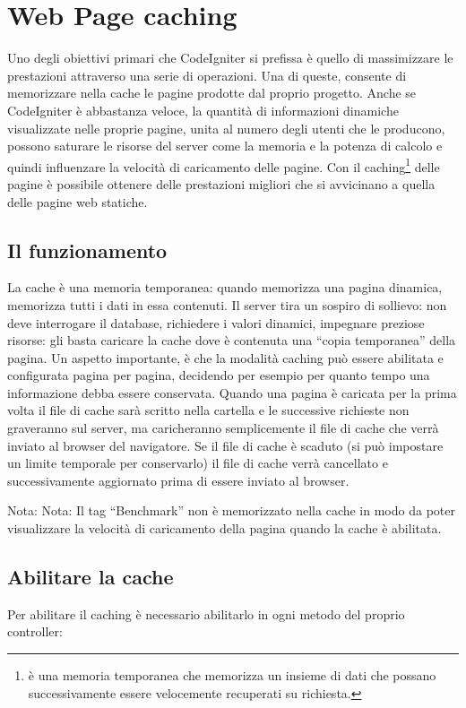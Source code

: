 \chapter{Web Page caching}
\label{cap:cache}

Uno degli obiettivi primari che CodeIgniter si prefissa è quello di massimizzare le prestazioni attraverso una serie di operazioni. Una di queste, consente di memorizzare nella cache le pagine prodotte dal proprio progetto. Anche se CodeIgniter è abbastanza veloce, la quantità di informazioni dinamiche visualizzate nelle proprie pagine, unita al numero degli utenti che le producono, possono saturare le risorse del server come la memoria e la potenza di calcolo e quindi influenzare la velocità di caricamento delle pagine. Con il caching\footnote{è una memoria temporanea che memorizza un insieme di dati che possano successivamente essere velocemente recuperati su richiesta.} delle pagine è possibile ottenere delle prestazioni migliori che si avvicinano a quella delle pagine web statiche.

\section{Il funzionamento}
La cache è una memoria temporanea: quando memorizza una pagina dinamica, memorizza tutti i dati in essa contenuti. Il server tira un sospiro di sollievo: non deve interrogare il database, richiedere i valori dinamici, impegnare preziose risorse: gli basta caricare la cache dove è contenuta una ``copia temporanea'' della pagina. Un aspetto importante, è che la modalità caching può essere abilitata e configurata pagina per pagina, decidendo per esempio per quanto tempo una informazione debba essere conservata. Quando una pagina è caricata per la prima volta il file di cache sarà scritto nella cartella  e le successive richieste non graveranno sul server, ma caricheranno semplicemente il file di cache che verrà inviato al browser del navigatore. Se il file di cache è scaduto (si può impostare un limite temporale per conservarlo) il file di cache verrà cancellato e successivamente aggiornato prima di essere inviato al browser.

Nota: Nota: Il tag ``Benchmark'' non è memorizzato nella cache in modo da poter visualizzare la velocità di caricamento della pagina quando la cache è abilitata.

\section{Abilitare la cache}
Per abilitare il caching è necessario abilitarlo in ogni metodo del proprio controller:

